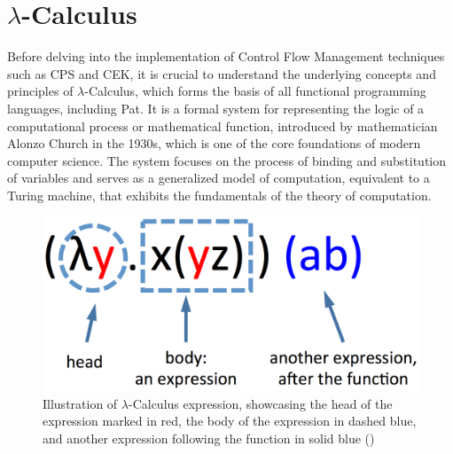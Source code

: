 \documentclass{l4proj}
\begin{document}
\section{\texorpdfstring{$\lambda$}{lambda}-Calculus}
Before delving into the implementation of Control Flow Management techniques such as CPS and CEK, it is crucial to understand the underlying concepts and principles of $\lambda$-Calculus, which forms the basis of all functional programming languages, including Pat. It is a formal system for representing the logic of a computational process or mathematical function, introduced by mathematician Alonzo Church in the 1930s, which is one of the core foundations of modern computer science. The system focuses on the process of binding and substitution of variables and serves as a generalized model of computation, equivalent to a Turing machine, that exhibits the fundamentals of the theory of computation.

\begin{figure}[h]
    \centering
    \includegraphics[width=0.35\linewidth]{dissertation/images/lambda1.png}    
    \caption{Illustration of $\lambda$-Calculus expression, showcasing the head of the expression marked in red, the body of the expression in dashed blue, and another expression following the function in solid blue (\cite{a2015_the})}
    \label{fig:lambda} 
\end{figure}
\end{document}
